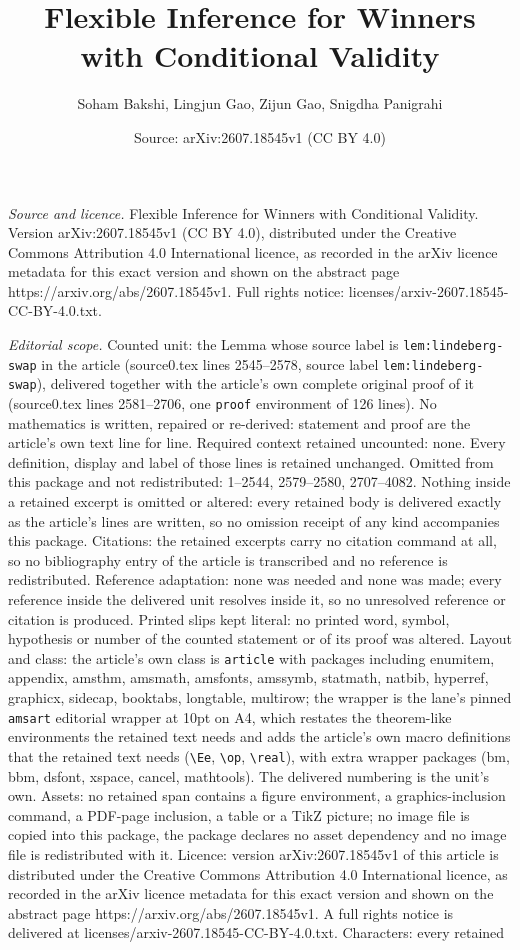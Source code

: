 \documentclass[10pt,a4paper]{amsart}
\title[Flexible Inference for Winners with Conditional Validity]{Flexible Inference for Winners with Conditional Validity}
\author{Soham Bakshi, Lingjun Gao, Zijun Gao, Snigdha Panigrahi}
\date{Source: arXiv:2607.18545v1 (CC BY 4.0)}
\begin{document}
\maketitle

\noindent\emph{Source and licence.} Flexible Inference for Winners with Conditional Validity. Version arXiv:2607.18545v1 (CC BY 4.0), distributed under the Creative Commons Attribution 4.0 International licence, as recorded in the arXiv licence metadata for this exact version and shown on the abstract page https://arxiv.org/abs/2607.18545v1. Full rights notice: licenses/arxiv-2607.18545-CC-BY-4.0.txt.\par\smallskip

\noindent\textit{Editorial scope.} Counted unit: the Lemma whose source label is \texttt{lem:lindeberg-swap} in the article (source0.tex lines 2545--2578, source label \texttt{lem:lindeberg-swap}), delivered together with the article's own complete original proof of it (source0.tex lines 2581--2706, one \texttt{proof} environment of 126 lines). No mathematics is written, repaired or re-derived: statement and proof are the article's own text line for line. Required context retained uncounted: none. Every definition, display and label of those lines is retained unchanged. Omitted from this package and not redistributed: 1--2544, 2579--2580, 2707--4082. Nothing inside a retained excerpt is omitted or altered: every retained body is delivered exactly as the article's lines are written, so no omission receipt of any kind accompanies this package. Citations: the retained excerpts carry no citation command at all, so no bibliography entry of the article is transcribed and no reference is redistributed. Reference adaptation: none was needed and none was made; every reference inside the delivered unit resolves inside it, so no unresolved reference or citation is produced. Printed slips kept literal: no printed word, symbol, hypothesis or number of the counted statement or of its proof was altered. Layout and class: the article's own class is \texttt{article} with packages including enumitem, appendix, amsthm, amsmath, amsfonts, amssymb, statmath, natbib, hyperref, graphicx, sidecap, booktabs, longtable, multirow; the wrapper is the lane's pinned \texttt{amsart} editorial wrapper at 10pt on A4, which restates the theorem-like environments the retained text needs and adds the article's own macro definitions that the retained text needs (\texttt{\textbackslash Ee}, \texttt{\textbackslash op}, \texttt{\textbackslash real}), with extra wrapper packages (bm, bbm, dsfont, xspace, cancel, mathtools). The delivered numbering is the unit's own. Assets: no retained span contains a figure environment, a graphics-inclusion command, a PDF-page inclusion, a table or a TikZ picture; no image file is copied into this package, the package declares no asset dependency and no image file is redistributed with it. Licence: version arXiv:2607.18545v1 of this article is distributed under the Creative Commons Attribution 4.0 International licence, as recorded in the arXiv licence metadata for this exact version and shown on the abstract page https://arxiv.org/abs/2607.18545v1. A full rights notice is delivered at licenses/arxiv-2607.18545-CC-BY-4.0.txt. Characters: every retained 
\end{document}
